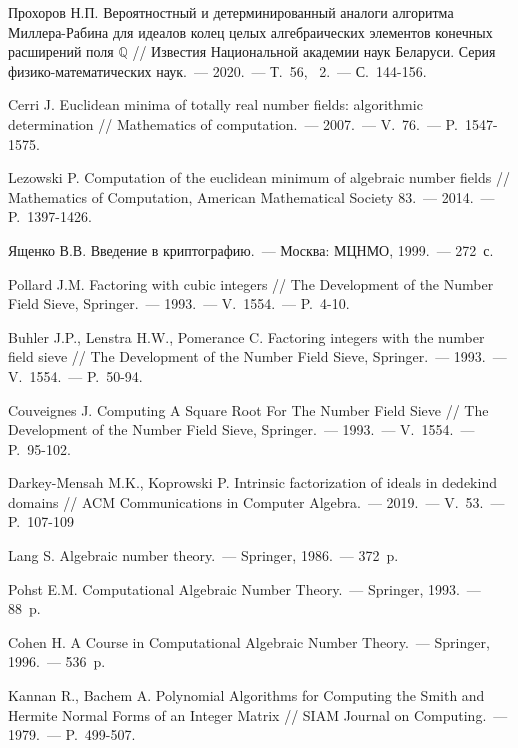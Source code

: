 \documentclass[_00_dissertation.tex]{subfiles}
\begin{document}
\begin{thebibliography}{99}
    Прохоров Н.П. Вероятностный и детерминированный аналоги алгоритма Миллера-Рабина для идеалов колец целых алгебраических элементов конечных расширений поля $\mathbb{Q}$ // Известия Национальной академии наук Беларуси. Серия физико-математических наук.~--- 2020.~--- Т.~56, \textnumero~2.~--- С.~144-156.

    Cerri J. Euclidean minima of totally real number fields: algorithmic determination // Mathematics of computation.~--- 2007.~--- V.~76.~--- P.~1547-1575.

    Lezowski P. Computation of the euclidean minimum of algebraic number fields // Mathematics of Computation, American Mathematical Society 83.~--- 2014.~--- P.~1397-1426.

    Ященко В.В. Введение в криптографию.~--- Москва: МЦНМО, 1999.~--- 272~с.
    
    Pollard J.M. Factoring with cubic integers // The Development of the Number Field Sieve, Springer.~--- 1993.~--- V.~1554.~--- P.~4-10.

    Buhler J.P., Lenstra H.W., Pomerance C. Factoring integers with the number field sieve // The Development of the Number Field Sieve, Springer.~--- 1993.~--- V.~1554.~--- P.~50-94.

    Couveignes J. Computing A Square Root For The Number Field Sieve // The Development of the Number Field Sieve, Springer.~--- 1993.~--- V.~1554.~--- P.~95-102.

    Darkey-Mensah M.K., Koprowski P. Intrinsic factorization of ideals in dedekind domains // ACM Communications in Computer Algebra.~--- 2019.~--- V.~53.~--- P.~107-109

    Lang S. Algebraic number theory.~--- Springer, 1986.~--- 372~p.

    Pohst E.M. Computational Algebraic Number Theory.~--- Springer, 1993.~--- 88~p.

    Cohen H. A Course in Computational Algebraic Number Theory.~--- Springer, 1996.~--- 536~p.

    Kannan R., Bachem A. Polynomial Algorithms for Computing the Smith and Hermite Normal Forms of an Integer Matrix // SIAM Journal on Computing.~--- 1979.~--- P.~499-507.


\end{thebibliography}
\end{document}

